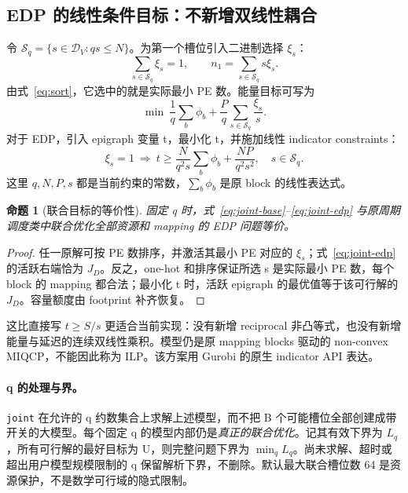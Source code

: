 \documentclass[UTF8,11pt,a4paper,fontset=fandol]{ctexart}
\newtheorem{proposition}{命题}[section]
\theoremstyle{remark}\newtheorem{remark}[proposition]{说明}
\numberwithin{equation}{section}
\begin{document}
\subsection{EDP 的线性条件目标：不新增双线性耦合}
令 $\mathcal S_q=\{s\in\mathcal D_V:qs\le N\}$。为第一个槽位引入二进制选择 $\xi_s$：
\begin{equation}
\sum_{s\in\mathcal S_q}\xi_s=1,\qquad
n_1=\sum_{s\in\mathcal S_q}s\xi_s.
\label{eq:min-selector}
\end{equation}
由式~\eqref{eq:sort}，它选中的就是实际最小 PE 数。能量目标可写为
\begin{equation}
\min\ \frac1q\sum_b\phi_b+\frac{P}{q}\sum_{s\in\mathcal S_q}\frac{\xi_s}{s}.
\label{eq:joint-energy}
\end{equation}
对于 EDP，引入 epigraph 变量 t，最小化 t，并施加线性 indicator constraints：
\begin{equation}
\xi_s=1\ \Longrightarrow\
t\ge\frac{N}{q^2s}\sum_b\phi_b+\frac{NP}{q^2s^2},
\quad s\in\mathcal S_q.
\label{eq:joint-edp}
\end{equation}
这里 $q,N,P,s$ 都是当前约束的常数，$\sum_b\phi_b$ 是原 block 的线性表达式。

\begin{proposition}[联合目标的等价性]
固定 q 时，式~\eqref{eq:joint-base}--\eqref{eq:joint-edp} 与原周期调度类中联合优化全部资源和 mapping 的 EDP 问题等价。
\end{proposition}
\begin{proof}
任一原解可按 PE 数排序，并激活其最小 PE 对应的 $\xi_s$；式~\eqref{eq:joint-edp} 的活跃右端恰为 $J_D$。反之，one-hot 和排序保证所选 s 是实际最小 PE 数，每个 block 的 mapping 都合法；最小化 t 时，活跃 epigraph 的最优值等于该可行解的 $J_D$。容量额度由 footprint 补齐恢复。
\end{proof}

这比直接写 $t\ge S/s$ 更适合当前实现：没有新增 reciprocal 非凸等式，也没有新增能量与延迟的连续双线性乘积。模型仍是原 mapping blocks 驱动的 non-convex MIQCP，不能因此称为 ILP。该方案用 Gurobi 的原生 indicator API 表达\cite{gurobi-api}。

\paragraph{q 的处理与界。}
\texttt{joint} 在允许的 q 约数集合上求解上述模型，而不把 B 个可能槽位全部创建成带开关的大模型。每个固定 q 的模型内部仍是\emph{真正的联合优化}。记其有效下界为 $L_q$，所有可行解的最好目标为 U，则完整问题下界为 $\min_q L_q$。尚未求解、超时或超出用户模型规模限制的 q 保留解析下界，不删除。默认最大联合槽位数 64 是资源保护，不是数学可行域的隐式限制。
\end{document}
